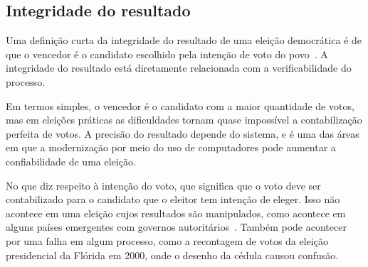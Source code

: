 \subsection{Integridade do resultado}

Uma definição curta da integridade do resultado de uma eleição democrática é de que o vencedor é o candidato escolhido pela intenção de voto do povo~\cite{norris2014electoral}. A integridade do resultado está diretamente relacionada com a verificabilidade do processo.

Em termos simples, o vencedor é o candidato com a maior quantidade de votos, mas em eleições práticas as dificuldades tornam quase impossível a contabilização perfeita de votos. A precisão do resultado depende do sistema, e é uma das áreas em que a modernização por meio do uso de computadores pode aumentar a confiabilidade de uma eleição.

No que diz respeito à intenção do voto, que significa que o voto deve ser contabilizado para o candidato que o eleitor tem intenção de eleger. Isso não acontece em uma eleição cujos resultados são manipulados, como acontece em alguns países emergentes com governos autoritários~\cite{van2013elections}. Também pode acontecer por uma falha em algum processo, como a recontagem de votos da eleição presidencial da Flórida em 2000, onde o desenho da cédula causou confusão.